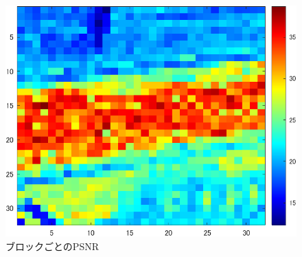 \documentclass[twocolumn, a4j]{jsarticle}
\begin{document}
\begin{figure}[h]
  \begin{center}
    \includegraphics[width=0.9\columnwidth]{figure/archive_20241225_psnr2.png}
  \end{center}
  \caption{ブロックごとのPSNR}
  \label{fig:4-5}
\end{figure}
\end{document}
